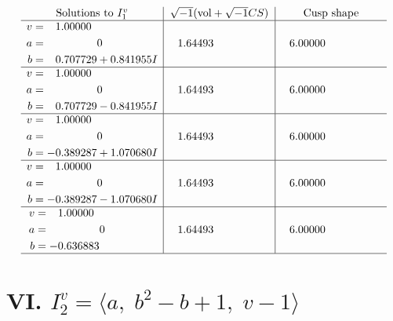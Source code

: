 \documentclass[1p]{elsarticle_modified}
\theoremstyle{definition}
\newcommand{\I}{\sqrt{-1}}
\begin{document}
$$\begin{array}{c|c|c}  
\text{Solutions to }I^v_{1}& \I (\text{vol} + \sqrt{-1}CS) & \text{Cusp shape}\\
 \hline 
\begin{aligned}
v &= \phantom{-}1.00000\phantom{ +0.000000I} \\
a &= \phantom{-0.000000 } 0 \\
b &= \phantom{-}0.707729 + 0.841955 I\end{aligned}
 & \phantom{-}1.64493\phantom{ +0.000000I} & \phantom{-}6.00000\phantom{ +0.000000I} \\ \hline\begin{aligned}
v &= \phantom{-}1.00000\phantom{ +0.000000I} \\
a &= \phantom{-0.000000 } 0 \\
b &= \phantom{-}0.707729 - 0.841955 I\end{aligned}
 & \phantom{-}1.64493\phantom{ +0.000000I} & \phantom{-}6.00000\phantom{ +0.000000I} \\ \hline\begin{aligned}
v &= \phantom{-}1.00000\phantom{ +0.000000I} \\
a &= \phantom{-0.000000 } 0 \\
b &= -0.389287 + 1.070680 I\end{aligned}
 & \phantom{-}1.64493\phantom{ +0.000000I} & \phantom{-}6.00000\phantom{ +0.000000I} \\ \hline\begin{aligned}
v &= \phantom{-}1.00000\phantom{ +0.000000I} \\
a &= \phantom{-0.000000 } 0 \\
b &= -0.389287 - 1.070680 I\end{aligned}
 & \phantom{-}1.64493\phantom{ +0.000000I} & \phantom{-}6.00000\phantom{ +0.000000I} \\ \hline\begin{aligned}
v &= \phantom{-}1.00000\phantom{ +0.000000I} \\
a &= \phantom{-0.000000 } 0 \\
b &= -0.636883\phantom{ +0.000000I}\end{aligned}
 & \phantom{-}1.64493\phantom{ +0.000000I} & \phantom{-}6.00000\phantom{ +0.000000I}\\
 \hline 
 \end{array}$$\newpage\newpage\renewcommand{\arraystretch}{1}
\centering \section*{VI. $I^v_{2}= \langle a,\;b^2- b+1,\;v-1 \rangle$}
\end{document}
